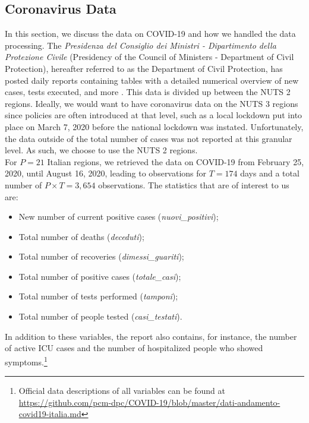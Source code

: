 \documentclass[12pt]{article}
\begin{document}
	\subsection{Coronavirus Data} \label{subsec:coronavirus_data}
	In this section, we discuss the data on COVID-19 and how we handled the data processing. The \textit{Presidenza del Consiglio dei Ministri - Dipartimento della Protezione Civile} (Presidency of the Council of Ministers - Department of Civil Protection), hereafter referred to as the Department of Civil Protection, has posted daily reports containing tables with a detailed numerical overview of new cases, tests executed, and more \parencite{Rosini2020Github}. This data is divided up between the NUTS 2 regions. Ideally, we would want to have coronavirus data on the NUTS 3 regions since policies are often introduced at that level, such as a local lockdown put into place on March 7, 2020 before the national lockdown was instated. Unfortunately, the data outside of the total number of cases was not reported at this granular level. As such, we choose to use the NUTS 2 regions.
	\\
	
	For $P = 21$ Italian regions, we retrieved the data on COVID-19 from February 25, 2020, until August 16, 2020, leading to observations for $T = 174$ days and a total number of $P \times T = 3,654$ observations. The statistics that are of interest to us are:
	\begin{itemize}
	    \item New number of current positive cases (\textit{nuovi\_positivi});
	    \item Total number of deaths (\textit{deceduti});
	    \item Total number of recoveries (\textit{dimessi\_guariti});
	    \item Total number of positive cases (\textit{totale\_casi});
	    \item Total number of tests performed (\textit{tamponi});
	    \item Total number of people tested (\textit{casi\_testati}).
	\end{itemize}
	
	In addition to these variables, the report also contains, for instance, the number of active ICU cases and the number of hospitalized people who showed symptoms.\footnote{Official data descriptions of all variables can be found at \url{https://github.com/pcm-dpc/COVID-19/blob/master/dati-andamento-covid19-italia.md}}
	\\
	
\end{document}
